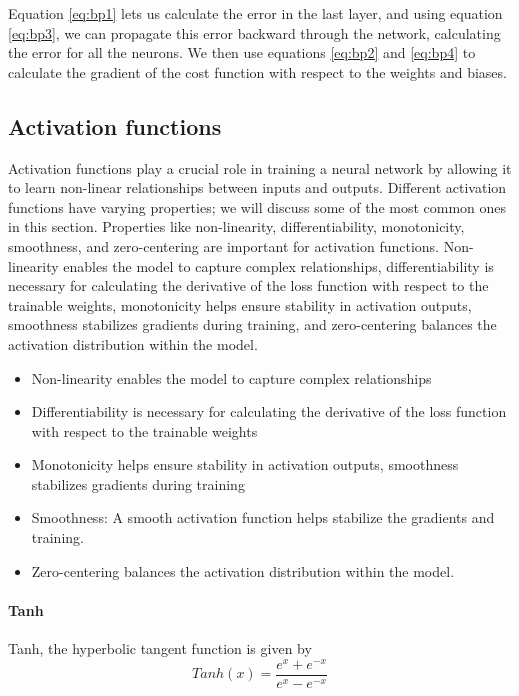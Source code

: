 Equation \eqref{eq:bp1} lets us calculate the error in the last layer, and using equation \eqref{eq:bp3}, we can propagate this error backward through the network, calculating the error for all the neurons.
We then use equations \eqref{eq:bp2} and \eqref{eq:bp4} to calculate the gradient of the cost function with respect to the weights and biases.


\subsection{Activation functions}
Activation functions play a crucial role in training a neural network by allowing it to learn non-linear relationships between inputs and outputs.
Different activation functions have varying properties; we will discuss some of the most common ones in this section.
Properties like non-linearity, differentiability, monotonicity, smoothness, and zero-centering are important for activation functions.
Non-linearity enables the model to capture complex relationships, differentiability is necessary for calculating the derivative of the loss function with respect to the trainable weights, monotonicity helps ensure stability in activation outputs, smoothness stabilizes gradients during training, and zero-centering balances the activation distribution within the model.

\begin{itemize}
    \item Non-linearity enables the model to capture complex relationships
    \item Differentiability is necessary for calculating the derivative of the loss function with respect to the trainable weights
    \item Monotonicity helps ensure stability in activation outputs, smoothness stabilizes gradients during training
    \item Smoothness: A smooth activation function helps stabilize the gradients and training.
    \item Zero-centering balances the activation distribution within the model.
\end{itemize}

\paragraph{Tanh}
Tanh, the hyperbolic tangent function is given by
\begin{equation}\label{eq:tanh}
    Tanh(x) = \frac{e^x+e^{-x}}{e^x-e^{-x}}
\end{equation}

